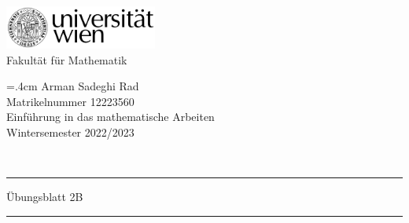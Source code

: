 \documentclass{article}
\theoremstyle{definition}
\begin{document}
	
	\thispagestyle{plain}
	\begin{minipage}{5cm}
		\includegraphics[width=5cm]{logo}\\
		\centering
		Fakultät für Mathematik
	\end{minipage}
	\hfill
	\begin{minipage}{7cm}
		\baselineskip=.4cm
		Arman Sadeghi Rad\\
		Matrikelnummer 12223560 \\
		Einführung in das mathematische Arbeiten \\
		Wintersemester 2022/2023
	\end{minipage}\\[1mm]
	\hrule height2pt \vskip1mm
	\noindent
	Übungsblatt 2B
	\hrule height2pt \vskip1mm
\end{document}
